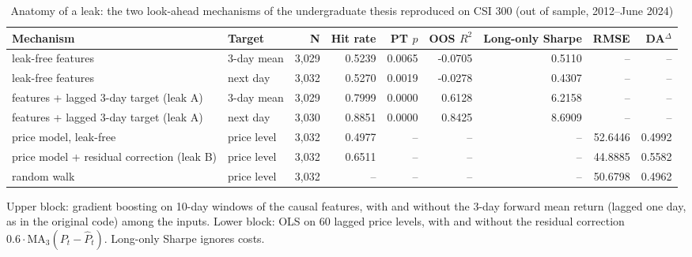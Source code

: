 \begin{table}[!htbp]\centering\scriptsize
\caption{Anatomy of a leak: the two look-ahead mechanisms of the undergraduate thesis reproduced on CSI 300 (out of sample, 2012--June 2024)}\label{tab:leak}
\begin{adjustbox}{max width=\textwidth}
\begin{tabular}{llrrrrrrr}
\toprule
Mechanism & Target & N & Hit rate & PT $p$ & OOS $R^2$ & Long-only Sharpe & RMSE & DA$^{\Delta}$\\
\midrule
leak-free features & 3-day mean & 3,029 & 0.5239 & 0.0065 & -0.0705 & 0.5110 & -- & --\\
leak-free features & next day & 3,032 & 0.5270 & 0.0019 & -0.0278 & 0.4307 & -- & --\\
features + lagged 3-day target (leak A) & 3-day mean & 3,029 & 0.7999 & 0.0000 & 0.6128 & 6.2158 & -- & --\\
features + lagged 3-day target (leak A) & next day & 3,030 & 0.8851 & 0.0000 & 0.8425 & 8.6909 & -- & --\\
price model, leak-free & price level & 3,032 & 0.4977 & -- & -- & -- & 52.6446 & 0.4992\\
price model + residual correction (leak B) & price level & 3,032 & 0.6511 & -- & -- & -- & 44.8885 & 0.5582\\
random walk & price level & 3,032 & -- & -- & -- & -- & 50.6798 & 0.4962\\
\bottomrule
\end{tabular}
\end{adjustbox}
\par\smallskip\begin{minipage}{\textwidth}\footnotesize
Upper block: gradient boosting on 10-day windows of the causal features, with and without the 3-day forward mean return (lagged one day, as in the original code) among the inputs. Lower block: OLS on 60 lagged price levels, with and without the residual correction $0.6\cdot\mathrm{MA}_3(P_t-\hat P_t)$. Long-only Sharpe ignores costs.
\end{minipage}
\end{table}